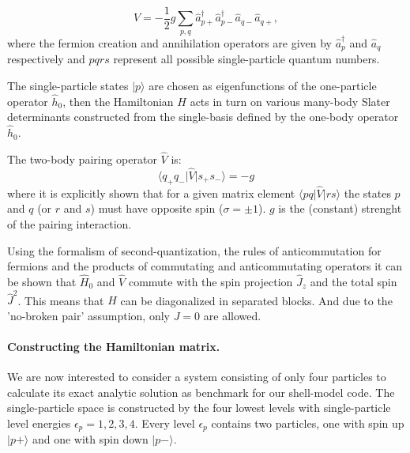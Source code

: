 \documentclass[twoside]{article}
\begin{document}
\begin{equation}
\hat V = -\frac{1}{2} g \sum_{p,q} \hat a_{p+}^\dagger \hat a_{p-}^\dagger \hat a_{q-} \hat a_{q+} ,\label{eq:V}
\end{equation}
where the fermion creation and annihilation operators are given by $\hat a_{p}^\dagger$ and $\hat a_{q}$ respectively and $pqrs$ represent all possible single-particle quantum numbers.

The single-particle states $\vert p \rangle$ are chosen as eigenfunctions of the one-particle operator $\hat{h}_0$, then the Hamiltonian $H$ acts in turn on various many-body Slater determinants constructed from the single-basis defined by the one-body operator $\hat{h}_0$.

The two-body pairing operator $\hat{V}$ is:
\begin{equation}
\langle q_+ q_- \vert \hat{V} \vert s_+s_- \rangle = -g
\end{equation}
where it is explicitly shown that for a given matrix element $\langle pq \vert \hat{V} \vert rs \rangle$ the states $p$ and $q$ (or $r$ and $s$) must have opposite spin ($\sigma=\pm 1$). $g$ is the (constant) strenght of the pairing interaction.

Using the formalism of second-quantization, the rules of anticommutation for fermions and the products of commutating and anticommutating operators it can be shown that $\hat{H}_0$ and $\hat{V}$ commute with the spin projection $\hat{J}_z$ and the total spin $\hat{J}^2$. This means that $H$ can be diagonalized in separated blocks. And due to the 'no-broken pair' assumption, only $J = 0$ are allowed.


\paragraph{Constructing the Hamiltonian matrix.}

We are now interested to consider a system consisting of only four particles to calculate its exact analytic solution as benchmark for our shell-model code. The single-particle space is constructed by the four lowest levels with single-particle level energies $\epsilon_p = 1, 2, 3, 4$. Every level $\epsilon_p$ contains two particles, one with spin up $\vert p+ \rangle$ and one with spin down $\vert p- \rangle$. 
\end{document}
